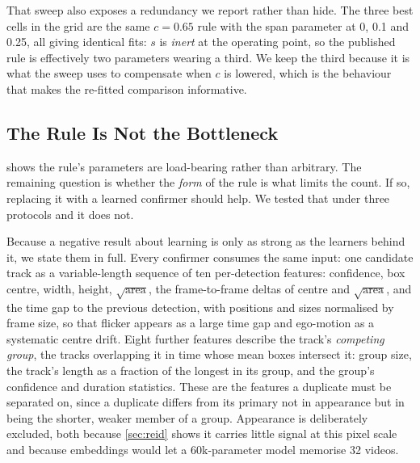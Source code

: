 That sweep also exposes a redundancy we report rather than hide. The three best cells in the
grid are the same $c=0.65$ rule with the span parameter at 0, 0.1 and 0.25, all giving
identical fits: $s$ is \emph{inert} at the operating point, so the published rule is
effectively two parameters wearing a third. We keep the third because it is what the sweep
uses to compensate when $c$ is lowered, which is the behaviour that makes the re-fitted
comparison informative.

\subsection{The Rule Is Not the Bottleneck}
\label{sec:learned}

 shows the rule's parameters are load-bearing rather than arbitrary.
The remaining question is whether the \emph{form} of the rule is what limits the count. If
so, replacing it with a learned confirmer should help. We tested that under three protocols
and it does not.

Because a negative result about learning is only as strong as the learners behind it, we
state them in full. Every confirmer consumes the same input: one candidate track as a
variable-length sequence of ten per-detection features: confidence, box centre, width, height, $\sqrt{\text{area}}$, the frame-to-frame deltas of centre and $\sqrt{\text{area}}$,
and the time gap to the previous detection, with positions and sizes normalised by frame
size, so that flicker appears as a large time gap and ego-motion as a systematic centre
drift. Eight further features describe the track's \emph{competing group}, the tracks
overlapping it in time whose mean boxes intersect it: group size, the track's length as a
fraction of the longest in its group, and the group's confidence and duration statistics.
These are the features a duplicate must be separated on, since a duplicate differs from its
primary not in appearance but in being the shorter, weaker member of a group. Appearance is
deliberately excluded, both because \cref{sec:reid} shows it carries little signal at this
pixel scale and because embeddings would let a 60k-parameter model memorise 32 videos.

